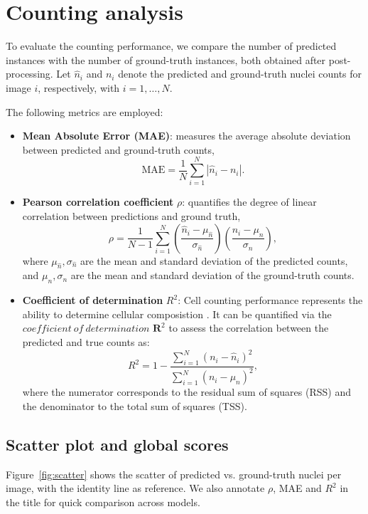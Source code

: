 \documentclass[target=bach,aauheader=,style=]{thud}
\begin{document}
\section{Counting analysis}
\label{sec:counting-analysis}
To evaluate the counting performance, we compare the number of predicted instances with the number of ground-truth instances, both obtained after post-processing. 
Let $\hat{n}_i$ and $n_i$ denote the predicted and ground-truth nuclei counts for image $i$, respectively, with $i=1,\dots,N$.

The following metrics are employed:

\begin{itemize}
    \item \textbf{Mean Absolute Error (MAE)}: measures the average absolute deviation between predicted and ground-truth counts,
    \begin{equation}
        \mathrm{MAE} = \frac{1}{N}\sum_{i=1}^{N} \left| \hat{n}_i - n_i \right|.
    \end{equation}

    \item \textbf{Pearson correlation coefficient} $\rho$: quantifies the degree of linear correlation between predictions and ground truth,
    \begin{equation}
        \rho = \frac{1}{N-1}\sum_{i=1}^N 
        \left(\frac{\hat{n}_i - \mu_{\hat{n}}}{\sigma_{\hat{n}}}\right)
        \left(\frac{n_i - \mu_{n}}{\sigma_{n}}\right),
    \end{equation}
    where $\mu_{\hat{n}}, \sigma_{\hat{n}}$ are the mean and standard deviation of the predicted counts, and $\mu_{n}, \sigma_{n}$ are the mean and standard deviation of the ground-truth counts.

    \item \textbf{Coefficient of determination} $R^2$: Cell counting performance represents the ability to determine cellular composistion \cite{kirillov2019panoptic}. It can be quantified via the $coefficient\ of\ determination$ $\textbf{R}^2$ to assess the correlation between the predicted and true counts as:
    \begin{equation}
        R^2 = 1 - \frac{\sum_{i=1}^N (n_i - \hat{n}_i)^2}{\sum_{i=1}^N (n_i - \mu_{n})^2},
    \end{equation}
    where the numerator corresponds to the residual sum of squares (RSS) and the denominator to the total sum of squares (TSS).
\end{itemize}

\subsection{Scatter plot and global scores}
Figure~\ref{fig:scatter} shows the scatter of predicted vs. ground-truth nuclei per image, with the identity line as reference.
We also annotate $\rho$, MAE and $R^2$ in the title for quick comparison across models.
\end{document}
